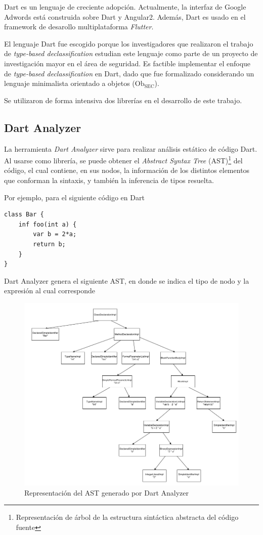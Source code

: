 	Dart es un lenguaje de creciente adopción. Actualmente, la interfaz de Google Adwords está construida sobre Dart y Angular2. Además, Dart es usado en el framework de desarollo multiplataforma \textit{Flutter}.

	El lenguaje Dart fue escogido porque los investigadores que realizaron el trabajo de \textit{type-based declassification} estudian este lenguaje como parte de un proyecto de investigación mayor en el área de seguridad. Es factible implementar el enfoque de \textit{type-based declassification} en Dart, dado que fue formalizado considerando un lenguaje minimalista orientado a objetos ($\text{Ob}_{\text{SEC}}$).

	Se utilizaron de forma intensiva dos librerías en el desarrollo de este trabajo.

	\subsection{Dart Analyzer}

	La herramienta \textit{Dart Analyzer} sirve para realizar análisis estático de código Dart. Al usarse como librería, se puede obtener el \textit{Abstract Syntax Tree} (AST)\footnote{Representación de árbol de la estructura sintáctica abstracta del código fuente} del código, el cual contiene, en sus nodos, la información de los distintos elementos que conforman la sintaxis, y también la inferencia de tipos resuelta. %

	Por ejemplo, para el siguiente código en Dart

	\begin{lstlisting}
class Bar {
	inf foo(int a) {
		var b = 2*a;
		return b;
	}
}
	\end{lstlisting}

	Dart Analyzer genera el siguiente AST, en donde se indica el tipo de nodo y la expresión al cual corresponde

	\begin{figure}[ht]
		\centering
		\includegraphics[scale=0.58]{imagenes/ast.png}
		\caption{Representación del AST generado por Dart Analyzer}
		\label{}
	\end{figure}


